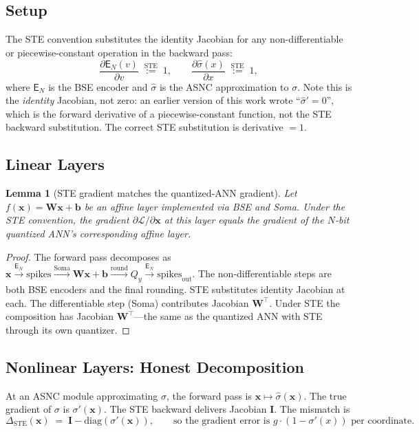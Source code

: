 \documentclass{article}
\theoremstyle{plain}
\newtheorem{lemma}[theorem]{Lemma}
\theoremstyle{definition}
\theoremstyle{remark}
\begin{document}
\subsection{Setup}

The STE convention substitutes the identity Jacobian for any non-differentiable
or piecewise-constant operation in the backward pass:
\[
\frac{\partial \mathsf{E}_N(v)}{\partial v} \;\stackrel{\mathrm{STE}}{:=}\; 1,
\qquad
\frac{\partial \hat\sigma(x)}{\partial x} \;\stackrel{\mathrm{STE}}{:=}\; 1,
\]
where $\mathsf{E}_N$ is the BSE encoder and $\hat\sigma$ is the ASNC
approximation to $\sigma$. Note this is the \emph{identity} Jacobian, not
zero: an earlier version of this work wrote ``$\hat\sigma' = 0$'', which is
the forward derivative of a piecewise-constant function, not the STE
backward substitution. The correct STE substitution is derivative $=1$.

\subsection{Linear Layers}

\begin{lemma}[STE gradient matches the quantized-ANN gradient]
\label{lem:ste_linear}
Let $f(\mathbf{x}) = \mathbf{W}\mathbf{x} + \mathbf{b}$ be an affine layer
implemented via BSE and Soma. Under the STE convention, the gradient
$\partial \mathcal{L}/\partial \mathbf{x}$ at this layer equals the gradient of
the $N$-bit quantized ANN's corresponding affine layer.
\end{lemma}

\begin{proof}
The forward pass decomposes as
$\mathbf{x} \xrightarrow{\mathsf{E}_N} \text{spikes} \xrightarrow{\text{Soma}}
\mathbf{W}\mathbf{x}+\mathbf{b} \xrightarrow{\text{round}} Q_y
\xrightarrow{\mathsf{E}_N} \text{spikes}_{\mathrm{out}}$. The non-differentiable
steps are both BSE encoders and the final rounding. STE substitutes identity
Jacobian at each. The differentiable step (Soma) contributes Jacobian
$\mathbf{W}^\top$. Under STE the composition has Jacobian
$\mathbf{W}^\top$---the same as the quantized ANN with STE through its own
quantizer.
\end{proof}

\subsection{Nonlinear Layers: Honest Decomposition}

At an ASNC module approximating $\sigma$, the forward pass is
$\mathbf{x}\mapsto \hat\sigma(\mathbf{x})$. The true gradient of $\sigma$ is
$\sigma'(\mathbf{x})$. The STE backward delivers Jacobian $\mathbf{I}$. The
mismatch is
\[
\Delta_{\mathrm{STE}}(\mathbf{x}) \;=\; \mathbf{I} - \mathrm{diag}(\sigma'(\mathbf{x})),
\qquad
\text{so the gradient error is } g\cdot(1-\sigma'(x)) \text{ per coordinate.}
\]
\end{document}
